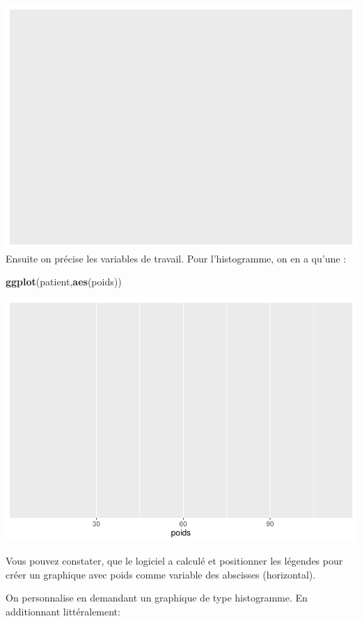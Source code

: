 \documentclass[
]{book}
\newenvironment{Shaded}{\begin{snugshade}}{\end{snugshade}}
\newcommand{\FunctionTok}[1]{\textcolor[rgb]{0.13,0.29,0.53}{\textbf{#1}}}
\newcommand{\NormalTok}[1]{#1}
\begin{document}
\includegraphics{_main_files/figure-latex/ggplot1-1.pdf}
Ensuite on précise les variables de travail. Pour l'histogramme, on en a qu'une :

\begin{Shaded}
\begin{Highlighting}[]
\FunctionTok{ggplot}\NormalTok{(patient,}\FunctionTok{aes}\NormalTok{(poids))}
\end{Highlighting}
\end{Shaded}

\includegraphics{_main_files/figure-latex/ggplot2-1.pdf}

Vous pouvez constater, que le logiciel a calculé et positionner les légendes
pour créer un graphique avec poids comme variable des abscisses (horizontal).

On personnalise en demandant un graphique de type histogramme. En additionnant
littéralement:
\end{document}
